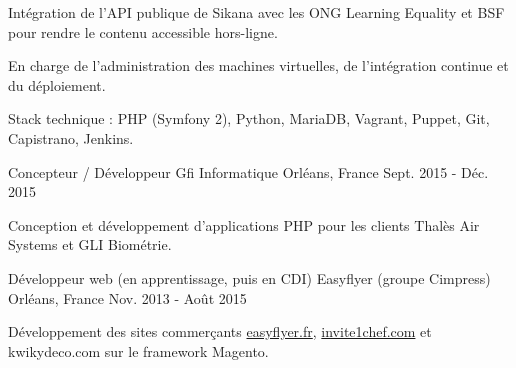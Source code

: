 \begin{cventries}
{\begin{cvitems}
        \item {Intégration de l'API publique de Sikana avec les ONG Learning Equality et BSF pour rendre le contenu accessible hors-ligne.}
        \item {En charge de l'administration des machines virtuelles, de l'intégration continue et du déploiement.}
        \item {Stack technique : PHP (Symfony 2), Python, MariaDB, Vagrant, Puppet, Git, Capistrano, Jenkins.}
      \end{cvitems}
    }
  \cventry
    {Concepteur / Développeur}
    {Gfi Informatique}
    {Orléans, France}
    {Sept. 2015 - Déc. 2015}
    {
      \begin{cvitems}
        \item {Conception et développement d'applications PHP pour les clients Thalès Air Systems et GLI Biométrie.}
      \end{cvitems}
    }
  \cventry
    {Développeur web (en apprentissage, puis en CDI)}
    {Easyflyer (groupe Cimpress)}
    {Orléans, France}
    {Nov. 2013 - Août 2015}
    {
      \begin{cvitems}
        \item {Développement des sites commerçants \href{https://www.easyflyer.fr}{easyflyer.fr}, \href{https://www.invite1chef.com}{invite1chef.com} et kwikydeco.com sur le framework Magento.}
      \end{cvitems}
    }
\end{cventries}
